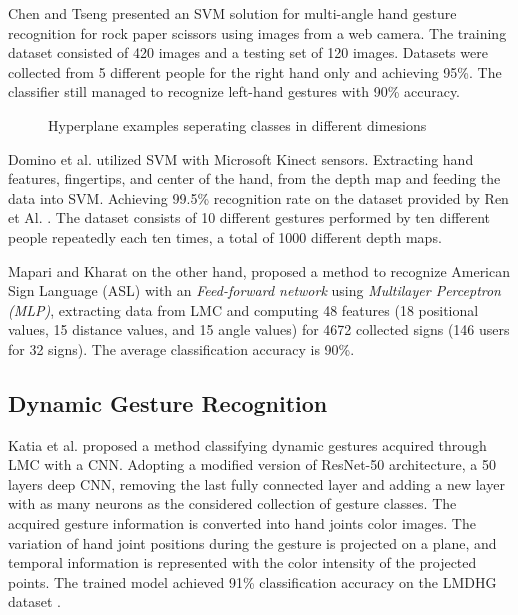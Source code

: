 Chen and Tseng \cite{chentseng} presented an SVM solution for multi-angle hand gesture recognition for rock paper scissors using images from a web camera. The training dataset consisted of 420 images and a testing set of 120 images. 
Datasets were collected from 5 different people for the right hand only and achieving 95\%. The classifier still managed to recognize left-hand gestures with 90\% accuracy. 

\begin{figure}[H]
	\centering
    \qquad
    \caption{Hyperplane examples seperating classes in different dimesions \cite{svm_pic}}
\end{figure}


Domino et al. \cite{dominokinect} utilized SVM with Microsoft Kinect sensors. Extracting hand features, fingertips, and center of the hand, from the depth map and feeding the data into SVM. Achieving 99.5\% recognition rate on the dataset provided by Ren et Al. \cite{dominokinect_data}. The dataset consists of 10 different gestures performed by ten different people repeatedly each ten times, a total of 1000 different depth maps.

Mapari and Kharat \cite{mapari} on the other hand, proposed a method to recognize American Sign Language (ASL) with an \textit{Feed-forward network} using \textit{Multilayer Perceptron (MLP)}, extracting data from LMC and computing 48 features (18 positional values, 15 distance values, and 15 angle values) for 4672 collected signs (146 users for 32 signs). The average classification accuracy is 90\%.

\subsection{Dynamic Gesture Recognition}

Katia et al. \cite{katiacnn} proposed a method classifying dynamic gestures acquired through LMC with a CNN.
Adopting a modified version of ResNet-50 architecture, a 50 layers deep CNN, removing the last fully connected layer and adding a new layer with as many neurons as the considered collection of gesture classes. 
The acquired gesture information is converted into hand joints color images. The variation of hand joint positions during the gesture is projected on a plane, and temporal information is represented with the color intensity of the projected points. The trained model achieved 91\% classification accuracy on the LMDHG dataset \cite{lmdhg}.

